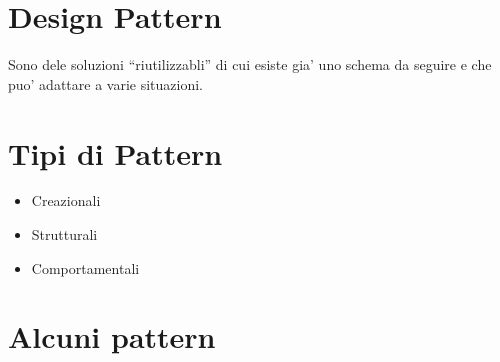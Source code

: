 \documentclass[\main/main.tex]{subfiles}
\begin{document}
\section{Design Pattern}
Sono dele soluzioni ``riutilizzabli'' di cui esiste gia' uno schema da seguire e che puo' adattare a varie situazioni.

\section{Tipi di Pattern}
\begin{itemize}
\item Creazionali
\item Strutturali
\item Comportamentali
\end{itemize}

\section{Alcuni pattern}
\end{document}
